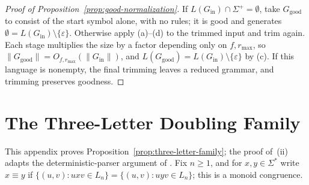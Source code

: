 \documentclass[11pt]{article}
\numberwithin{equation}{section}
\theoremstyle{plain}
\theoremstyle{definition}
\theoremstyle{remark}
\newcommand{\eps}{\varepsilon}
\theoremstyle{plain}
\begin{document}
\begin{proof}[Proof of Proposition~\ref{prop:good-normalization}]
If $L(G_{\mathrm{in}})\cap\Sigma^+=\emptyset$, take $G_{\mathrm{good}}$ to consist of the
start symbol alone, with no rules; it is good and generates
$\emptyset=L(G_{\mathrm{in}})\setminus\{\eps\}$.  Otherwise apply (a)--(d) to the trimmed
input and trim again.  Each stage multiplies the size by a
factor depending only on $f,r_{\max}$, so
$\|G_{\mathrm{good}}\|=O_{f,r_{\max}}(\|G_{\mathrm{in}}\|)$, and
$L(G_{\mathrm{good}})=L(G_{\mathrm{in}})\setminus\{\eps\}$ by (c).  If this language is
nonempty, the final trimming leaves a reduced grammar, and trimming preserves goodness.
\end{proof}

\section{The Three-Letter Doubling Family}
\label{app:bracketed-family}
\label{app:three-letter-family}

This appendix proves Proposition~\ref{prop:three-letter-family}; the proof of~(ii)
adapts the deterministic-parser argument of \cite[Appendix~C]{kuriyamaCFG}.  Fix
$n\ge1$, and for $x,y\in\Sigma^*$ write $x\equiv y$ if
$\{(u,v):uxv\in L_n\}=\{(u,v):uyv\in L_n\}$; this is a monoid congruence.
\end{document}
